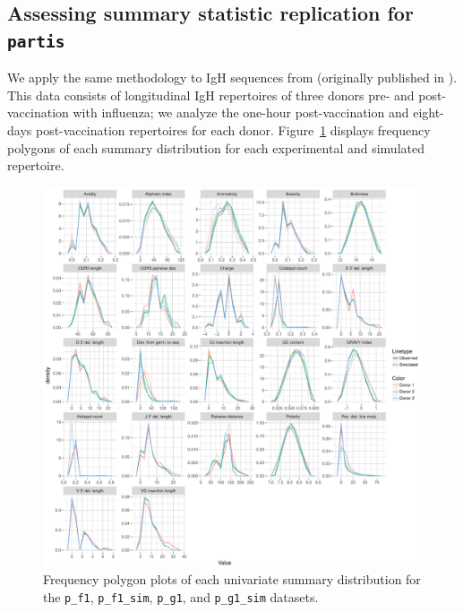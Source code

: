 \documentclass{article}
\newcommand{\partis}{\texttt{partis}}
\begin{document}
\subsection*{Assessing summary statistic replication for \partis}
We apply the same methodology to IgH sequences from \cite{Gupta2017-ve} (originally published in \cite{Laserson2014-dx}).
This data consists of longitudinal IgH repertoires of three donors pre- and post-vaccination with influenza; we analyze the one-hour post-vaccination and eight-days post-vaccination repertoires for each donor.
Figure~\ref{fig:PartisFreqPolys} displays frequency polygons of each summary distribution for each experimental and simulated repertoire.
\begin{figure}
    \includegraphics[width=\linewidth]{Figures/PartisScores/partis_freqpoly.pdf}
    \caption{Frequency polygon plots of each univariate summary distribution for the \texttt{p\_f1}, \texttt{p\_f1\_sim}, \texttt{p\_g1}, and \texttt{p\_g1\_sim} datasets.}
    \label{fig:PartisFreqPolys}
\end{figure}
\end{document}
